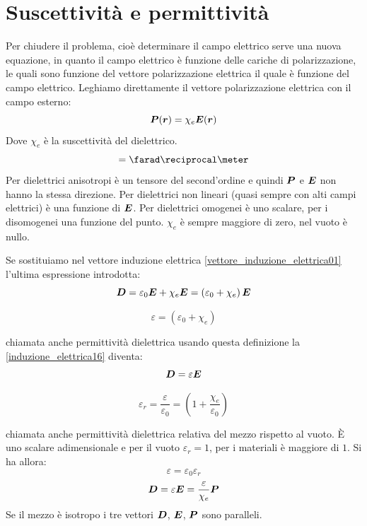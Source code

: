 \section{Suscettività e permittività}
Per chiudere il problema, cioè determinare il campo elettrico serve una nuova equazione, in quanto il campo elettrico è funzione delle cariche di polarizzazione, le quali sono funzione del vettore polarizzazione elettrica il quale è funzione del campo elettrico. Leghiamo direttamente il vettore polarizzazione elettrica con il campo esterno:
\begin{equation}
\boldsymbol{P}(\boldsymbol{r})=\chi_e\boldsymbol{E}(\boldsymbol{r})
\end{equation}
Dove $\chi_e$ è la suscettività del dielettrico.
\begin{equation*}
[\chi_e] = \farad\reciprocal\meter
\end{equation*}
Per dielettrici anisotropi è un tensore del second'ordine e quindi $\boldsymbol{P}$ e $\boldsymbol{E}$ non hanno la stessa direzione. Per dielettrici non lineari (quasi sempre con alti campi elettrici) è una funzione di $\boldsymbol{E}$. Per dielettrici omogenei è uno scalare, per i disomogenei una funzione del punto. $\chi_e$ è sempre maggiore di zero, nel vuoto è nullo.

Se sostituiamo nel vettore induzione elettrica \eqref{vettore_induzione_elettrica01} l'ultima espressione introdotta:
\begin{equation}
\boldsymbol{D}=\varepsilon_0\boldsymbol{E}+\chi_e\boldsymbol{E}=\left(\varepsilon_0+\chi_e\right)\boldsymbol{E}
\label{induzione_elettrica16}
\end{equation}
\begin{Def}
\begin{equation}
\varepsilon=\left(\varepsilon_0+\chi_e\right)
\end{equation}
\end{Def}
chiamata anche permittività dielettrica
usando questa definizione la \eqref{induzione_elettrica16} diventa:
\begin{equation}
\boldsymbol{D}=\varepsilon\boldsymbol{E}
\end{equation}
\begin{Def}
\begin{equation}
\varepsilon_r=\frac{\varepsilon}{\varepsilon_0}=\left(1+\frac{\chi_e}{\varepsilon_0}\right)
\end{equation}
\end{Def}
chiamata anche permittività dielettrica relativa del mezzo rispetto al vuoto. \`E uno scalare adimensionale e per il vuoto $\varepsilon_r=1$, per i materiali è maggiore di $1$. Si ha allora:
\begin{equation}
\varepsilon=\varepsilon_0\varepsilon_r
\end{equation}
\begin{equation}
\boldsymbol{D}=\varepsilon\boldsymbol{E}=\frac{\varepsilon}{\chi_e}\boldsymbol{P}
\end{equation}
Se il mezzo è isotropo i tre vettori $\boldsymbol{D}$, $\boldsymbol{E}$, $\boldsymbol{P}$ sono paralleli.


